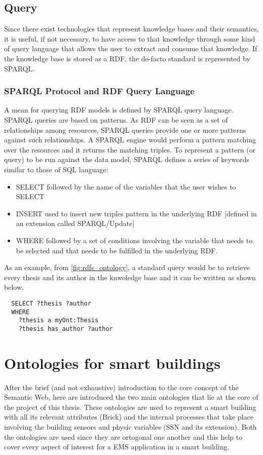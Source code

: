 \subsection{Query}
Since there exist technologies that represent knowledge bases and their semantics, it is useful, if not necessary, to have access to that knowledge through some kind of query language that allows the user to extract and consume that knowledge. If the knowledge base is stored as a RDF, the de-facto standard is represented by SPARQL.

\subsubsection{SPARQL Protocol and RDF Query Language}
A mean for querying RDF models is defined by SPARQL \cite{sparql_reccomendation} query language. SPARQL queries are based on patterns. As RDF can be seen as a set of relationships among resources, SPARQL queries provide one or more patterns against such relationships. A SPARQL engine would perform a pattern matching over the resources and it returns the matching triples. To represent a pattern (or query) to be run against the data model, SPARQL defines a series of keywords similar to those of SQL language:
\begin{itemize}
  \item SELECT followed by the name of the variables that the user wishes to SELECT
  \item INSERT used to insert new triples pattern in the underlying RDF [defined in an extension called SPARQL/Update]
  \item WHERE followed by a set of conditions involving the variable that needs to be selected and that needs to be fulfilled in the underlying RDF.
\end{itemize}
As an example, from \autoref{fig:rdfs_ontology}, a standard query would be to retrieve every thesis and its author in the knwoledge base and it can be written as shown below.
\begin{verbatim}
  SELECT ?thesis ?author
  WHERE
    ?thesis a myOnt:Thesis
    ?thesis has_author ?author
\end{verbatim}


\section{Ontologies for smart buildings}
After the brief (and not exhaustive) introduction to the core concept of the Semantic Web, here are introduced the two main ontologies that lie at the core of the project of this thesis. These ontologies are used to represent a smart building with all its relevant attributes (Brick) and the internal processes that take place involving the building sensors and physic variables (SSN and its extension). Both the ontologies are used since they are ortogonal one another and this help to cover every aspect of interest for a EMS application in a smart building.

